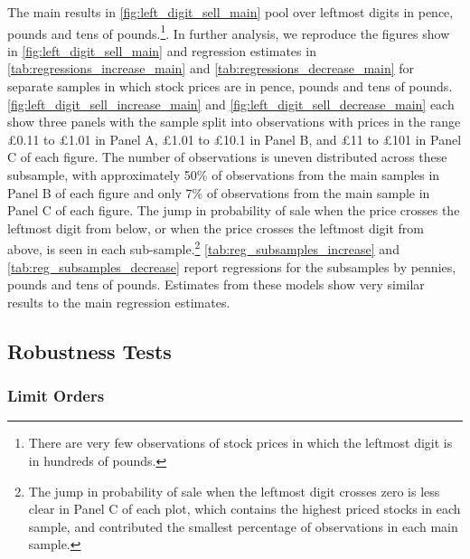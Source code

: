 The main results in  \ref{fig:left_digit_sell_main} pool over leftmost digits in pence, pounds and tens of pounds.\footnote{There are very few observations of stock prices in which the leftmost digit is in hundreds of pounds.}. In further analysis, we reproduce the figures show in  \ref{fig:left_digit_sell_main} and regression estimates in \ref{tab:regressions_increase_main} and \ref{tab:regressions_decrease_main} for separate samples in which stock prices are in pence, pounds and tens of pounds. \ref{fig:left_digit_sell_increase_main} and \ref{fig:left_digit_sell_decrease_main} each show three panels with the sample split into observations with prices in the range \pounds0.11 to \pounds1.01 in Panel A, \pounds1.01 to \pounds10.1 in Panel B, and \pounds11 to \pounds101 in Panel C of each figure. The number of observations is uneven distributed across these subsample, with approximately 50\% of observations from the main samples in Panel B of each figure and only 7\% of observations from the main sample in Panel C of each figure.  The jump in probability of sale when the price crosses the leftmost digit from below, or when the price crosses the leftmost digit from above, is seen in each sub-sample.\footnote{The jump in probability of sale when the leftmost digit crosses zero is less clear in Panel C of each plot, which contains the highest priced stocks in each sample, and contributed the smallest percentage of observations in each main sample.} \ref{tab:reg_subsamples_increase} and \ref{tab:reg_subsamples_decrease} report regressions for the subsamples by pennies, pounds and tens of pounds. Estimates from these models show very similar results to the main regression estimates.

\subsection{Robustness Tests}

\subsubsection{Limit Orders}

